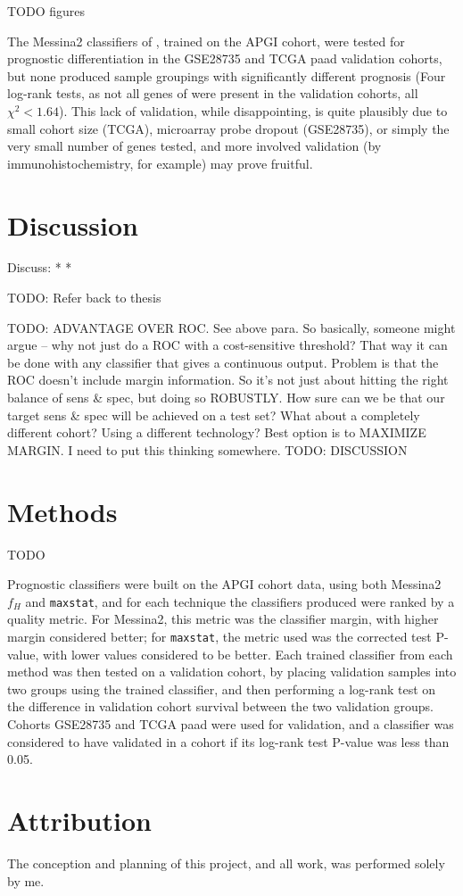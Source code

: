 \documentclass[dissertation.tex]{subfiles}
\begin{document}
TODO figures

The Messina2 classifiers of , trained on the \gls{APGI} cohort, were tested for prognostic differentiation in the GSE28735 and \gls{TCGA} paad validation cohorts, but none produced sample groupings with significantly different prognosis (Four log-rank tests, as not all genes of  were present in the validation cohorts, all $\chi^2 < 1.64$).  This lack of validation, while disappointing, is quite plausibly due to small cohort size (TCGA), microarray probe dropout (GSE28735), or simply the very small number of genes tested, and more involved validation (by immunohistochemistry, for example) may prove fruitful.

\section{Discussion}

Discuss:
  * 
  * 

TODO: Refer back to thesis

TODO: ADVANTAGE OVER ROC.  See above para.  So basically, someone might argue -- why not just do a ROC with a cost-sensitive threshold?  That way it can be done with any classifier that gives a continuous output.  Problem is that the ROC doesn't include margin information.  So it's not just about hitting the right balance of sens & spec, but doing so ROBUSTLY.  How sure can we be that our target sens & spec will be achieved on a test set?  What about a completely different cohort?  Using a different technology?  Best option is to MAXIMIZE MARGIN.  I need to put this thinking somewhere.  TODO: DISCUSSION

\section{Methods}

TODO

Prognostic classifiers were built on the \gls{APGI} cohort data, using both Messina2 $f_H$ and \texttt{maxstat}, and for each technique the classifiers produced were ranked by a quality metric.  For Messina2, this metric was the classifier margin, with higher margin considered better; for \texttt{maxstat}, the metric used was the corrected test P-value, with lower values considered to be better.  Each trained classifier from each method was then tested on a validation cohort, by placing validation samples into two groups using the trained classifier, and then performing a log-rank test on the difference in validation cohort survival between the two validation groups.  Cohorts GSE28735 and \gls{TCGA} paad were used for validation, and a classifier was considered to have validated in a cohort if its log-rank test P-value was less than 0.05.

\section{Attribution}
The conception and planning of this project, and all work, was performed solely by me.
\end{document}

